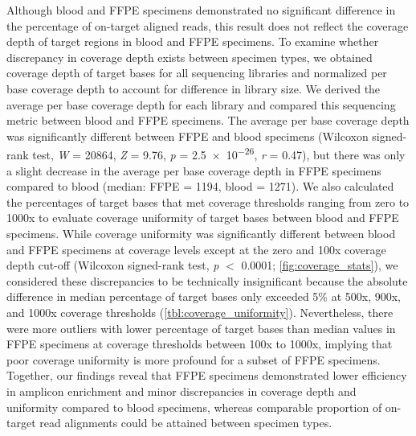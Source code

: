 Although blood and FFPE specimens demonstrated no significant difference in the percentage of on-target aligned reads, this result does not reflect the coverage depth of target regions in blood and FFPE specimens. To examine whether discrepancy in coverage depth exists between specimen types, we obtained coverage depth of target bases for all sequencing libraries and normalized per base coverage depth to account for difference in library size. We derived the average per base coverage depth for each library and compared this sequencing metric between blood and FFPE specimens. The average per base coverage depth was significantly different between FFPE and blood specimens (Wilcoxon signed-rank test, \textit{W} = \num{20864}, \textit{Z} = 9.76, \textit{p} = \num{2.5e-26}, \textit{r} = 0.47), but there was only a slight decrease in the average per base coverage depth in FFPE specimens compared to blood (median: FFPE = 1194, blood = 1271). We also calculated the percentages of target bases that met coverage thresholds ranging from zero to 1000x to evaluate coverage uniformity of target bases between blood and FFPE specimens. While coverage uniformity was significantly different between blood and FFPE specimens at coverage levels except at the zero and 100x coverage depth cut-off (Wilcoxon signed-rank test, \textit{p} $<$ \num{0.0001}; \autoref{fig:coverage_stats}), we considered these discrepancies to be technically insignificant because the absolute difference in median percentage of target bases only exceeded 5\% at 500x, 900x, and 1000x coverage thresholds (\autoref{tbl:coverage_uniformity}). Nevertheless, there were more outliers with lower percentage of target bases than median values in FFPE specimens at coverage thresholds between 100x to 1000x, implying that poor coverage uniformity is more profound for a subset of FFPE specimens. Together, our findings reveal that FFPE specimens demonstrated lower efficiency in amplicon enrichment and minor discrepancies in coverage depth and uniformity compared to blood specimens, whereas comparable proportion of on-target read alignments could be attained between specimen types.


